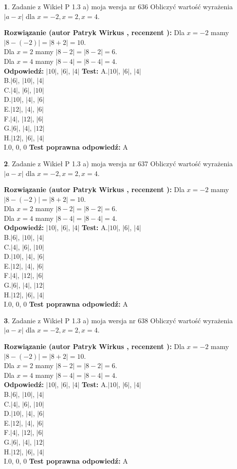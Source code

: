 \documentclass[12pt, a4paper]{article}
\theoremstyle{definition} %
\newtheorem{zad}{}
\newcommand{\zadStart}[1]{\begin{zad}#1\newline}
\newcommand{\zadStop}{\end{zad}}
\newcommand{\rozwStart}[2]{\noindent \textbf{Rozwiązanie (autor #1 , recenzent #2): }\newline}
\newcommand{\rozwStop}{\newline}
\newcommand{\odpStart}{\noindent \textbf{Odpowiedź:}\newline}
\newcommand{\odpStop}{\newline}
\newcommand{\testStart}{\noindent \textbf{Test:}\newline}
\newcommand{\testStop}{\newline}
\newcommand{\kluczStart}{\noindent \textbf{Test poprawna odpowiedź:}\newline}
\newcommand{\kluczStop}{\newline}
\begin{document}
\zadStart{Zadanie z Wikieł P 1.3 a) moja wersja nr 636}
Obliczyć wartość wyrażenia $|a - x|$ dla $x=-2,x=2,x=4$.
\zadStop
\rozwStart{Patryk Wirkus}{}
Dla $x = -2$ mamy $|8 - (-2)| = |8 + 2| = 10$.\\
Dla $x = 2$ mamy $|8 - 2| = |8 - 2| = 6$.\\
Dla $x = 4$ mamy $|8 - 4| = |8 - 4| = 4$.\\
\rozwStop
\odpStart
$|10|$, $|6|$, $|4|$
\odpStop
\testStart
A.$|10|$, $|6|$, $|4|$\\
B.$|6|$, $|10|$, $|4|$\\
C.$|4|$, $|6|$, $|10|$\\
D.$|10|$, $|4|$, $|6|$\\
E.$|12|$, $|4|$, $|6|$\\
F.$|4|$, $|12|$, $|6|$\\
G.$|6|$, $|4|$, $|12|$\\
H.$|12|$, $|6|$, $|4|$\\
I.$0$, $0$, $0$
\testStop
\kluczStart
A
\kluczStop



\zadStart{Zadanie z Wikieł P 1.3 a) moja wersja nr 637}
Obliczyć wartość wyrażenia $|a - x|$ dla $x=-2,x=2,x=4$.
\zadStop
\rozwStart{Patryk Wirkus}{}
Dla $x = -2$ mamy $|8 - (-2)| = |8 + 2| = 10$.\\
Dla $x = 2$ mamy $|8 - 2| = |8 - 2| = 6$.\\
Dla $x = 4$ mamy $|8 - 4| = |8 - 4| = 4$.\\
\rozwStop
\odpStart
$|10|$, $|6|$, $|4|$
\odpStop
\testStart
A.$|10|$, $|6|$, $|4|$\\
B.$|6|$, $|10|$, $|4|$\\
C.$|4|$, $|6|$, $|10|$\\
D.$|10|$, $|4|$, $|6|$\\
E.$|12|$, $|4|$, $|6|$\\
F.$|4|$, $|12|$, $|6|$\\
G.$|6|$, $|4|$, $|12|$\\
H.$|12|$, $|6|$, $|4|$\\
I.$0$, $0$, $0$
\testStop
\kluczStart
A
\kluczStop



\zadStart{Zadanie z Wikieł P 1.3 a) moja wersja nr 638}
Obliczyć wartość wyrażenia $|a - x|$ dla $x=-2,x=2,x=4$.
\zadStop
\rozwStart{Patryk Wirkus}{}
Dla $x = -2$ mamy $|8 - (-2)| = |8 + 2| = 10$.\\
Dla $x = 2$ mamy $|8 - 2| = |8 - 2| = 6$.\\
Dla $x = 4$ mamy $|8 - 4| = |8 - 4| = 4$.\\
\rozwStop
\odpStart
$|10|$, $|6|$, $|4|$
\odpStop
\testStart
A.$|10|$, $|6|$, $|4|$\\
B.$|6|$, $|10|$, $|4|$\\
C.$|4|$, $|6|$, $|10|$\\
D.$|10|$, $|4|$, $|6|$\\
E.$|12|$, $|4|$, $|6|$\\
F.$|4|$, $|12|$, $|6|$\\
G.$|6|$, $|4|$, $|12|$\\
H.$|12|$, $|6|$, $|4|$\\
I.$0$, $0$, $0$
\testStop
\kluczStart
A
\kluczStop
\end{document}

